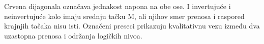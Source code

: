 Crvena dijagonala označava jednakost napona na obe ose. I invertujuće i neinvertujuće kolo imaju srednju tačku M, ali njihov smer prenosa i raspored krajnjih tačaka nisu isti. Označeni preseci prikazuju kvalitativnu vezu između dva uzastopna prenosa i održanja logičkih nivoa.
